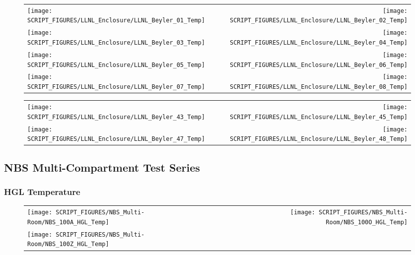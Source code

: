 \begin{figure}[p]
\begin{tabular*}{\textwidth}{l@{\extracolsep{\fill}}r}
\texttt{[image: SCRIPT\_FIGURES/LLNL\_Enclosure/LLNL\_Beyler\_01\_Temp]} &
\texttt{[image: SCRIPT\_FIGURES/LLNL\_Enclosure/LLNL\_Beyler\_02\_Temp]} \\
\texttt{[image: SCRIPT\_FIGURES/LLNL\_Enclosure/LLNL\_Beyler\_03\_Temp]} &
\texttt{[image: SCRIPT\_FIGURES/LLNL\_Enclosure/LLNL\_Beyler\_04\_Temp]} \\
\texttt{[image: SCRIPT\_FIGURES/LLNL\_Enclosure/LLNL\_Beyler\_05\_Temp]} &
\texttt{[image: SCRIPT\_FIGURES/LLNL\_Enclosure/LLNL\_Beyler\_06\_Temp]} \\
\texttt{[image: SCRIPT\_FIGURES/LLNL\_Enclosure/LLNL\_Beyler\_07\_Temp]} &
\texttt{[image: SCRIPT\_FIGURES/LLNL\_Enclosure/LLNL\_Beyler\_08\_Temp]}
\end{tabular*}
\end{figure}

\begin{figure}[p]
\begin{tabular*}{\textwidth}{l@{\extracolsep{\fill}}r}
\texttt{[image: SCRIPT\_FIGURES/LLNL\_Enclosure/LLNL\_Beyler\_43\_Temp]} &
\texttt{[image: SCRIPT\_FIGURES/LLNL\_Enclosure/LLNL\_Beyler\_45\_Temp]} \\
\texttt{[image: SCRIPT\_FIGURES/LLNL\_Enclosure/LLNL\_Beyler\_47\_Temp]} &
\texttt{[image: SCRIPT\_FIGURES/LLNL\_Enclosure/LLNL\_Beyler\_48\_Temp]}
\end{tabular*}
\end{figure}

\clearpage

\subsection{NBS Multi-Compartment Test Series}

\subsubsection{HGL Temperature}

\begin{figure}[p]
\begin{tabular*}{\textwidth}{l@{\extracolsep{\fill}}r}
\texttt{[image: SCRIPT\_FIGURES/NBS\_Multi-Room/NBS\_100A\_HGL\_Temp]} &
\texttt{[image: SCRIPT\_FIGURES/NBS\_Multi-Room/NBS\_100O\_HGL\_Temp]} \\
\texttt{[image: SCRIPT\_FIGURES/NBS\_Multi-Room/NBS\_100Z\_HGL\_Temp]}
\end{tabular*}
\end{figure}

